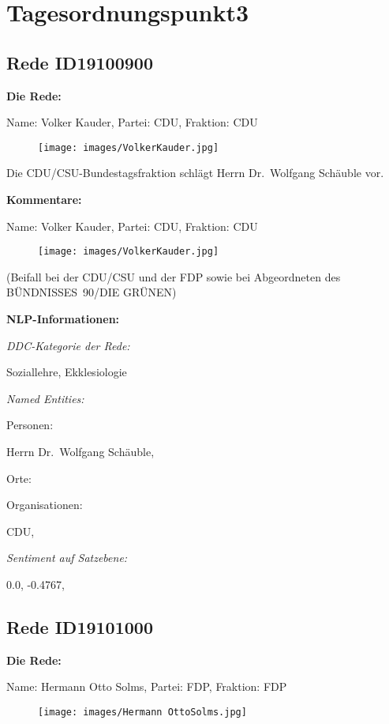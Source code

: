 \documentclass[10pt, a4paper]{report}
\begin{document}
\section{Tagesordnungspunkt3}
\subsection{Rede ID19100900}

\textbf{Die Rede:}

Name: Volker Kauder, Partei: CDU, Fraktion: CDU

\begin{figure}[!ht]
\texttt{[image: images/VolkerKauder.jpg]}
\end{figure}


Die CDU/CSU-Bundestagsfraktion schlägt Herrn Dr. Wolfgang Schäuble vor. 

\textbf{Kommentare:}

Name: Volker Kauder, Partei: CDU, Fraktion: CDU

\begin{figure}[!ht]
\texttt{[image: images/VolkerKauder.jpg]}
\end{figure}


(Beifall bei der CDU/CSU und der FDP sowie bei Abgeordneten des BÜNDNISSES 90/DIE GRÜNEN)


\textbf{NLP-Informationen:}

\textit{DDC-Kategorie der Rede:}

Soziallehre, Ekklesiologie

\textit{Named Entities:}

Personen:

Herrn Dr. Wolfgang Schäuble, 

Orte:



Organisationen:

CDU, 

\textit{Sentiment auf Satzebene:}

0.0, -0.4767, 
\subsection{Rede ID19101000}

\textbf{Die Rede:}

Name: Hermann Otto Solms, Partei: FDP, Fraktion: FDP

\begin{figure}[!ht]
\texttt{[image: images/Hermann OttoSolms.jpg]}
\end{figure}
\end{document}
